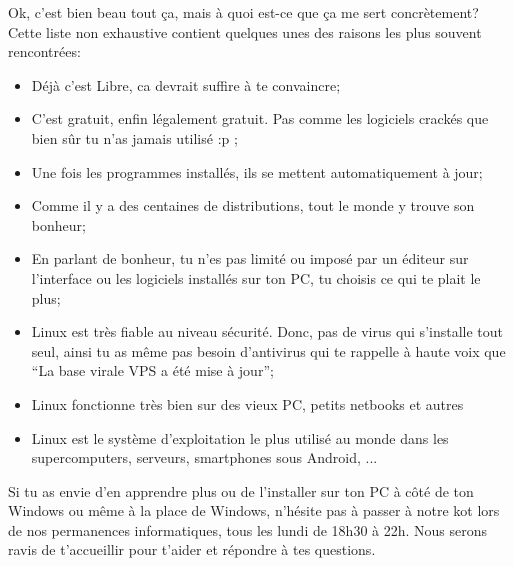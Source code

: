 \documentclass[12pt]{../fiche}
\begin{document}
Ok, c'est bien beau tout ça, mais à quoi est-ce que ça me sert concrètement?
Cette liste non exhaustive contient quelques unes des raisons les plus souvent rencontrées:
\begin{itemize}
\item Déjà c’est Libre, ca devrait suffire à te convaincre;
\item C'est gratuit, enfin légalement gratuit. Pas comme les logiciels crackés que bien sûr tu n’as jamais utilisé :p ;
\item Une fois les programmes installés, ils se mettent automatiquement à jour;
\item Comme il y a des centaines de distributions, tout le monde y trouve son bonheur;
\item En parlant de bonheur, tu n’es pas limité ou imposé par un éditeur sur l’interface ou les logiciels installés sur ton PC, tu choisis ce qui te plait le plus;
\item Linux est très fiable au niveau sécurité. Donc, pas de virus qui s’installe tout seul, ainsi tu as même pas besoin d'antivirus qui te rappelle à haute voix que “La base virale VPS a été mise à jour”;
\item Linux fonctionne très bien sur des vieux PC, petits netbooks et autres
\item Linux est le système d’exploitation le plus utilisé au monde dans les supercomputers, serveurs, smartphones sous Android, ... 
\end{itemize}

Si tu as envie d’en apprendre plus ou de l’installer sur ton PC à côté de ton Windows ou même à la place de Windows, n’hésite pas à passer à notre kot lors de nos permanences informatiques, tous les lundi de 18h30 à 22h. Nous serons ravis de t’accueillir pour t’aider et répondre à tes questions.
\end{document}
